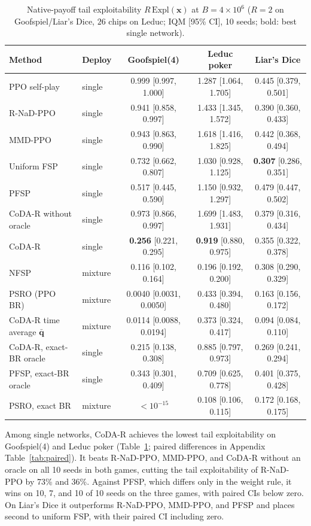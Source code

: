 \documentclass{article} %
\theoremstyle{plain}
\theoremstyle{remark}
\newcommand{\Expl}{\mathrm{Expl}}
\newcommand{\bx}{{\bm{x}}}
\newcommand{\bq}{{\bm{q}}}
\newcommand{\codar}{CoDA-R}
\newcommand{\rnad}{R-NaD-PPO}
\begin{document}
\begin{table}[t]
\caption{Native-payoff tail exploitability $R\,\Expl(\bx)$ at $B=4\times10^6$ ($R=2$ on Goofspiel/Liar's Dice, $26$ chips on Leduc; IQM [95\% CI], 10 seeds; bold: best single network).}
\label{tab:main}
\begin{center}
\scriptsize
\setlength{\tabcolsep}{3pt}
\begin{tabular}{llccc}
\toprule
Method & Deploy & Goofspiel(4) & Leduc poker & Liar's Dice \\
\midrule
PPO self-play & single & 0.999 [0.997, 1.000] & 1.287 [1.064, 1.705] & 0.445 [0.379, 0.501] \\
\rnad{} & single & 0.941 [0.858, 0.997] & 1.433 [1.345, 1.572] & 0.390 [0.360, 0.433] \\
MMD-PPO & single & 0.943 [0.863, 0.990] & 1.618 [1.416, 1.825] & 0.442 [0.368, 0.494] \\
Uniform FSP & single & 0.732 [0.662, 0.807] & 1.030 [0.928, 1.125] & \textbf{0.307} [0.286, 0.351] \\
PFSP & single & 0.517 [0.445, 0.590] & 1.150 [0.932, 1.297] & 0.479 [0.447, 0.502] \\
\codar{} without oracle & single & 0.973 [0.866, 0.997] & 1.699 [1.483, 1.931] & 0.379 [0.316, 0.434] \\
\codar{} & single & \textbf{0.256} [0.221, 0.295] & \textbf{0.919} [0.880, 0.975] & 0.355 [0.322, 0.378] \\
\midrule
NFSP & mixture & 0.116 [0.102, 0.164] & 0.196 [0.192, 0.200] & 0.308 [0.290, 0.329] \\
PSRO (PPO BR) & mixture & 0.0040 [0.0031, 0.0050] & 0.433 [0.394, 0.480] & 0.163 [0.156, 0.172] \\
\codar{} time average $\bar{\bq}$ & mixture & 0.0114 [0.0088, 0.0194] & 0.373 [0.324, 0.417] & 0.094 [0.084, 0.110] \\
\midrule
\codar{}, exact-BR oracle & single & 0.215 [0.138, 0.308] & 0.885 [0.797, 0.973] & 0.269 [0.241, 0.294] \\
PFSP, exact-BR oracle & single & 0.343 [0.301, 0.409] & 0.709 [0.625, 0.778] & 0.401 [0.375, 0.428] \\
PSRO, exact BR & mixture & $<10^{-15}$ & 0.108 [0.106, 0.115] & 0.172 [0.168, 0.175] \\
\bottomrule
\end{tabular}
\end{center}
\end{table}


Among single networks, \codar{} achieves the lowest tail exploitability on Goofspiel(4) and Leduc poker (Table~\ref{tab:main}; paired differences in Appendix Table~\ref{tab:paired}). It beats \rnad{}, MMD-PPO, and \codar{} without an oracle on all 10 seeds in both games, cutting the tail exploitability of \rnad{} by 73\% and 36\%. Against PFSP, which differs only in the weight rule, it wins on 10, 7, and 10 of 10 seeds on the three games, with paired CIs below zero. On Liar's Dice it outperforms \rnad{}, MMD-PPO, and PFSP and places second to uniform FSP, with their paired CI including zero.
\end{document}
